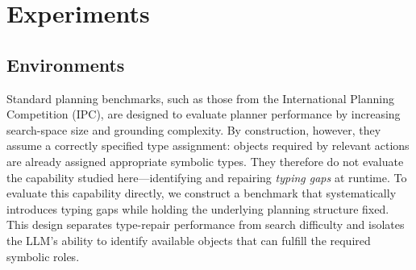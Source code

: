\section{Experiments}
\subsection{Environments}
Standard planning benchmarks, such as those from the International Planning Competition (IPC), are designed to evaluate planner performance by increasing search-space size and grounding complexity. By construction, however, they assume a correctly specified type assignment: objects required by relevant actions are already assigned appropriate symbolic types. They therefore do not evaluate the capability studied here—identifying and repairing \emph{typing gaps} at runtime. To evaluate this capability directly, we construct a benchmark that systematically introduces typing gaps while holding the underlying planning structure fixed. This design separates type-repair performance from search difficulty and isolates the LLM's ability to identify available objects that can fulfill the required symbolic roles.



